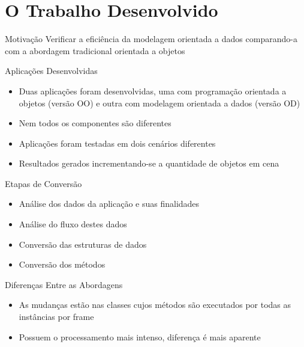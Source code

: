 \documentclass{beamer}
\begin{document}
\section{O Trabalho Desenvolvido}

\frame{\tableofcontents[currentsection]}

\begin{frame}{Motivação}
    \centering
    \LARGE{Verificar a eficiência da modelagem orientada a dados comparando-a 
    com a abordagem tradicional orientada a objetos}
\end{frame}

\begin{frame}{Aplicações Desenvolvidas}
    \begin{itemize}
        \item Duas aplicações foram desenvolvidas, uma com programação orientada a objetos (versão OO)
            e outra com modelagem orientada a dados (versão OD)
        \item Nem todos os componentes são diferentes
        \item Aplicações foram testadas em dois cenários diferentes
        \item Resultados gerados incrementando-se a quantidade de objetos em cena
    \end{itemize}
\end{frame}

\begin{frame}{Etapas de Conversão}
    \begin{itemize}
        \item Análise dos dados da aplicação e suas finalidades
        \item Análise do fluxo destes dados
        \item Conversão das estruturas de dados
        \item Conversão dos métodos
    \end{itemize}
\end{frame}

\begin{frame}{Diferenças Entre as Abordagens}
    \begin{itemize}
        \item As mudanças estão nas classes cujos métodos são executados por todas as instâncias por frame
        \item Possuem o processamento mais intenso, diferença é mais aparente
    \end{itemize}
\end{frame}
\end{document}
